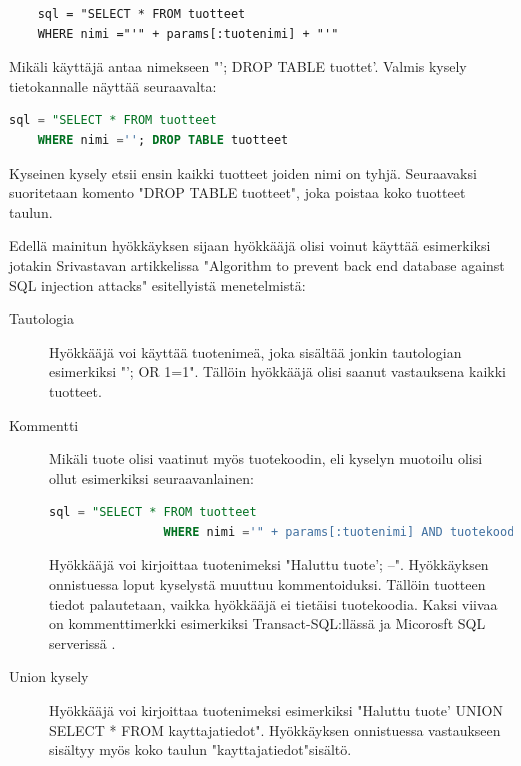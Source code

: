 \documentclass[finnish]{tktltiki2}
\theoremstyle{definition}
\theoremstyle{remark}
\begin{document}
	\begin{lstlisting}
	sql = "SELECT * FROM tuotteet
	WHERE nimi ="'" + params[:tuotenimi] + "'"
	\end{lstlisting}
	
	Mikäli käyttäjä antaa nimekseen "\space'; DROP TABLE tuottet'. Valmis kysely tietokannalle näyttää seuraavalta:
	
	\begin{lstlisting}[language=sql]
	sql = "SELECT * FROM tuotteet
	WHERE nimi =''; DROP TABLE tuotteet     
	\end{lstlisting}
	
	Kyseinen kysely etsii ensin kaikki tuotteet joiden nimi on tyhjä. Seuraavaksi suoritetaan komento "DROP TABLE tuotteet", joka poistaa koko tuotteet taulun.
	
	 Edellä mainitun hyökkäyksen sijaan hyökkääjä olisi voinut käyttää esimerkiksi jotakin Srivastavan artikkelissa "Algorithm to prevent back end database against SQL injection attacks"\space \cite{piggy} esitellyistä menetelmistä:  
		\begin{description}
			
		\item[Tautologia] \hfill
		
		Hyökkääjä voi käyttää tuotenimeä, joka sisältää jonkin tautologian esimerkiksi "'; OR 1=1". Tällöin hyökkääjä olisi saanut vastauksena kaikki tuotteet.
		
		\item[Kommentti] \hfill
		
		Mikäli tuote olisi vaatinut myös tuotekoodin, eli kyselyn muotoilu olisi ollut esimerkiksi seuraavanlainen:
			\begin{lstlisting}[language=sql]
				sql = "SELECT * FROM tuotteet
				WHERE nimi ='" + params[:tuotenimi] AND tuotekoodi ='"params[:tuotekoodi]"'
			\end{lstlisting}
			Hyökkääjä voi kirjoittaa tuotenimeksi "Haluttu tuote'; --". Hyökkäyksen onnistuessa loput kyselystä muuttuu kommentoiduksi. Tällöin tuotteen tiedot palautetaan, vaikka hyökkääjä ei tietäisi tuotekoodia. Kaksi viivaa on kommenttimerkki esimerkiksi Transact-SQL:llässä ja Micorosft SQL serverissä \cite{sqlids}.
			
		\item[Union kysely] \hfill
		
		Hyökkääjä voi kirjoittaa tuotenimeksi esimerkiksi "Haluttu tuote' UNION SELECT * FROM kayttajatiedot". Hyökkäyksen onnistuessa vastaukseen sisältyy myös koko taulun "kayttajatiedot"\space sisältö.
	\end{description}
	
\end{document}
